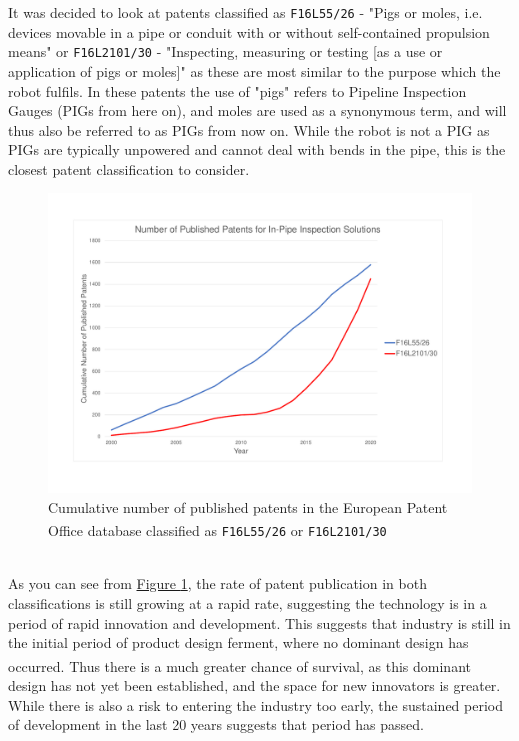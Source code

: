 \documentclass[11pt]{article}		%
\newlength{\imageheight}	 %
\begin{document}
		It was decided to look at patents classified as \verb|F16L55/26| - "Pigs or moles, i.e. devices movable in a pipe or conduit with or without self-contained propulsion means" or \verb|F16L2101/30| - "Inspecting, measuring or testing [as a use or application of pigs or moles]" as these are most similar to the purpose which the robot fulfils.
		In these patents the use of "pigs" refers to Pipeline Inspection Gauges (PIGs from here on), and moles are used as a synonymous term, and will thus also be referred to as PIGs from now on.
		While the robot is not a PIG as PIGs are typically unpowered and cannot deal with bends in the pipe, this is the closest patent classification to consider.
		\begin{figure}[h]
				\centering
				\includegraphics[height=\imageheight]{patentGraph}
				\caption{Cumulative number of published patents in the European Patent Office database classified as \texttt{F16L55/26}\textsuperscript{\cite{patent26}} or \texttt{F16L2101/30}\textsuperscript{\cite{patent30}} }
				\label{patentGraph}
		\end{figure}
		\\
		As you can see from \hyperref[patentGraph]{Figure \ref*{patentGraph}}, the rate of patent publication in both classifications is still growing at a rapid rate, suggesting the technology is in a period of rapid innovation and development.
		This suggests that industry is still in the initial period of product design ferment, where no dominant design has occurred\textsuperscript{\cite{christensen1998innovation}}.
		Thus there is a much greater chance of survival, as this dominant design has not yet been established, and the space for new innovators is greater.
		While there is also a risk to entering the industry too early, the sustained period of development in the last 20 years suggests that period has passed.
		
\end{document}
